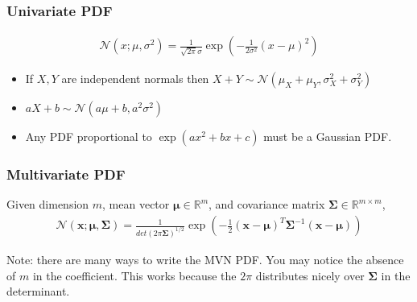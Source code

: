 \documentclass{harvardml}
\theoremstyle{definition}
\theoremstyle{plain}
\newcommand{\R}{\mathbb{R}}
\renewcommand{\v}[1]{\mathbf{#1}}
\begin{document}
		\subsubsection{Univariate PDF}
			\begin{align*}
				\mathcal{N}(x; \mu, \sigma^2) = 
				\frac{1}{\sqrt{2\pi}\sigma} 
				\exp\left( -\frac{1}{2\sigma^2} (x - \mu)^2 \right)
			\end{align*}

		\begin{itemize}
			\item If $X,Y$ are independent normals then $X + Y \sim 
				  \mathcal{N}(\mu_X + \mu_Y, \sigma_X^2 + \sigma_Y^2)$
			\item $aX+b \sim \mathcal{N}(a\mu + b, a^2 \sigma^2)$
			\item Any PDF proportional to $\exp(ax^2 + bx + c)$ 
				  must be a Gaussian PDF.
		\end{itemize}

		\subsubsection{Multivariate PDF}
		Given dimension $m$, mean vector $\v \mu \in \R^m$,
        and covariance matrix $\v \Sigma \in \R^{m \times m}$,
		\begin{align*}
            \mathcal{N}(\v x ; \v \mu, \v \Sigma) = 
                        \frac{1}{det(2\pi\v \Sigma)^{1/2}}
			            \exp \left( -\frac{1}{2} (\v x - \v \mu)^T 
						\v \Sigma^{-1} 
                        (\v x - \v \mu) \right)
		\end{align*}

		\noindent Note: there are many ways to write the MVN PDF. 
		You may notice the absence of $m$ in the coefficient. 
		This works because the $2\pi$ distributes nicely over 
		$\v \Sigma$ in the determinant.
\end{document}
